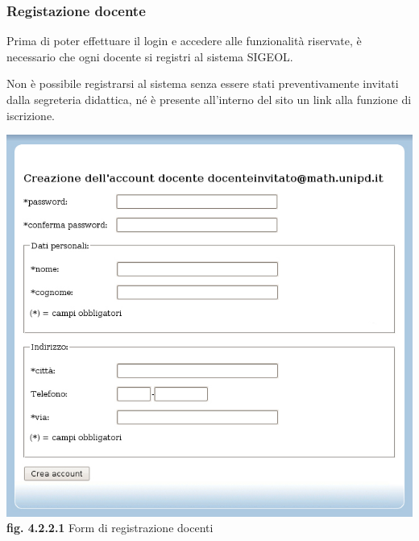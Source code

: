 \documentclass[11pt,a4paper]{article}
\begin{document}
\subsubsection{Registazione docente}
Prima di poter effettuare il login e accedere alle funzionalità riservate, è necessario che ogni docente si registri al sistema SIGEOL.

Non è possibile registrarsi al sistema senza essere stati preventivamente invitati dalla segreteria didattica, né è presente all'interno del sito un link alla funzione di iscrizione.

\begin{center}
	\includegraphics[scale=0.5]{images/registrazione_docente.jpg}\\ 
	\textbf{fig. 4.2.2.1} Form di registrazione docenti\\
\end{center}
\bigskip
\end{document}
